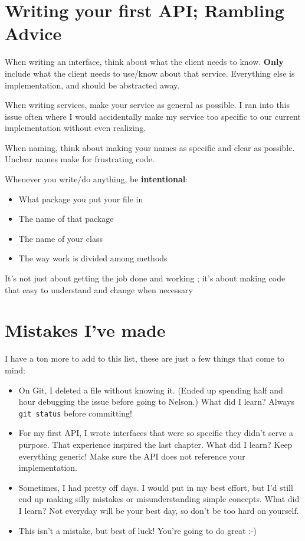 \documentclass[oneside]{book}
\begin{document}
\chapter{Writing your first API; Rambling Advice}
When writing an interface, think about what the client needs to know. \textbf{Only} include what the client needs to use/know about that service. Everything else is implementation, and should be abstracted away. \par
When writing services, make your service as general as possible. I ran into this issue often where I would accidentally make my service too specific to our current implementation without even realizing.\par
When naming, think about making your names as specific and clear as possible. Unclear names make for frustrating code. \par
Whenever you write/do anything, be \textbf{intentional}:
\begin{itemize}
	\item What package you put your file in
	\item The name of that package
	\item The name of your class
	\item The way work is divided among methods
\end{itemize}		
It’s not just about getting the job done and working ; it’s about making code that easy to understand and change when necessary
\chapter{Mistakes I've made}
I have a ton more to add to this list, these are just a few things that come to mind:
\begin{itemize}
	\item On Git, I deleted a file without knowing it. (Ended up spending half and hour debugging the issue before going to Nelson.) What did I learn? Always \texttt{git status} before committing!
	\item For my first API, I wrote interfaces that were so specific they didn't serve a purpose. That experience inspired the last chapter. What did I learn? Keep everything generic! Make sure the API does not reference your implementation.
	\item Sometimes, I had pretty off days. I would put in my best effort, but I'd still end up making silly mistakes or misunderstanding simple concepts. What did I learn? Not everyday will be your best day, so don't be too hard on yourself.
	\item This isn't a mistake, but best of luck! You're going to do great :-)
\end{itemize}
\end{document}

